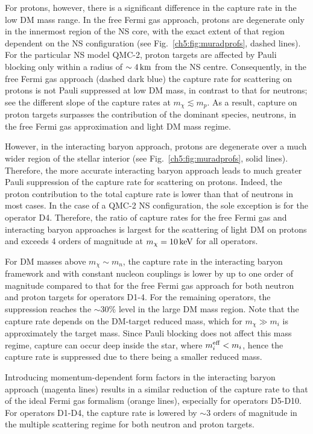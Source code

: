 For protons, however, there is a significant difference in the capture rate in the low DM mass range. In the free Fermi gas approach, protons are degenerate only in the innermost region of the NS core, with the exact extent of that region dependent on the NS configuration (see Fig.~\ref{ch5:fig:muradprofs}, dashed lines).  For the particular NS model QMC-2, proton targets are affected by Pauli blocking only within a radius of $\sim4{\rm \,km}$ from the NS centre. Consequently, in the free Fermi gas approach (dashed dark blue) the capture rate for scattering on protons is not Pauli suppressed at low DM mass, in contrast to that for neutrons; see the different slope of the capture rates at $m_\chi\lesssim m_p$.
As a result, capture on proton targets surpasses the contribution of the dominant species, neutrons, in the free Fermi gas approximation and light DM mass regime. 

However, in the interacting baryon approach, protons are degenerate over a much wider region of the stellar interior (see Fig.~\ref{ch5:fig:muradprofs}, solid lines). Therefore, the more accurate interacting baryon approach leads to much greater Pauli suppression of the capture rate for scattering on protons. Indeed, the proton contribution to the total capture rate is lower than that of neutrons in most cases. In the case of a QMC-2 NS configuration, the sole exception is for the operator D4. Therefore,  the ratio of capture rates for the free Fermi gas and interacting baryon approaches is largest for the scattering of light DM on protons and exceeds 4 orders of magnitude at $m_\chi=10{\rm \,keV}$ for all operators. 


For DM masses above $m_\chi\sim m_n$, the capture rate in the interacting baryon framework and with constant nucleon couplings is lower by up to one order of magnitude compared to that for the free Fermi gas approach for both neutron and proton targets for operators D1-4.
For the remaining operators, the suppression reaches the $\sim30\%$ level in the large DM mass region. 
Note that the capture rate depends on the DM-target reduced mass, which for $m_\chi\gg m_i$ is approximately the target mass. Since Pauli blocking does not affect this mass regime, capture can occur deep inside the star, where $m_i^{\rm eff}<m_i$, hence the capture rate is suppressed due to there being a smaller reduced mass.

Introducing momentum-dependent form factors in the interacting baryon approach (magenta lines) results in a similar reduction of the capture rate to that of the ideal Fermi gas formalism (orange lines), especially for operators D5-D10. For operators D1-D4, the capture rate is lowered by $\sim3$ orders of magnitude in the multiple scattering regime for both neutron and proton targets. 


